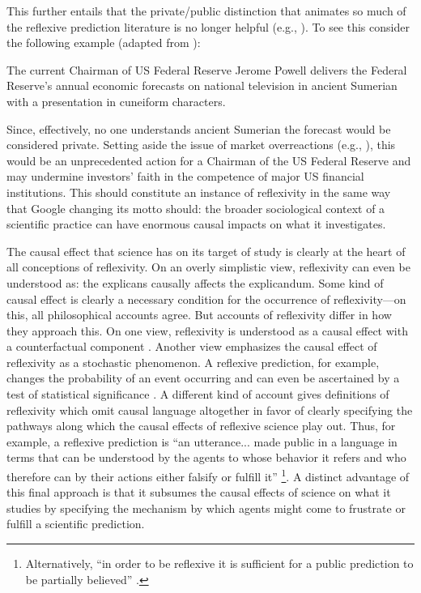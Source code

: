 This further entails that the private/public distinction that animates so much of the reflexive prediction literature is no longer helpful (e.g., \cite{buck1963,romanos1973,grunberg1986}). To see this consider the following example (adapted from \cite{grunberg1986}):

\begin{example}
The current Chairman of US Federal Reserve Jerome Powell delivers the Federal Reserve's annual economic forecasts on national television in ancient Sumerian with a presentation in cuneiform characters.
\end{example}

\noindent Since, effectively, no one understands ancient Sumerian the forecast would be considered private. Setting aside the issue of market overreactions (e.g., \cite{debondt1985}), this would be an unprecedented action for a Chairman of the US Federal Reserve and may undermine investors' faith in the competence of major US financial institutions. This should constitute an instance of reflexivity in the same way that Google changing its motto should: the broader sociological context of a scientific practice can have enormous causal impacts on what it investigates.

The causal effect that science has on its target of study is clearly at the heart of all conceptions of reflexivity. On an overly simplistic view, reflexivity can even be understood as: the explicans causally affects the explicandum. Some kind of causal effect is clearly a necessary condition for the occurrence of reflexivity---on this, all philosophical accounts agree. But accounts of reflexivity differ in how they approach this. On one view, reflexivity is understood as a causal effect with a counterfactual component \autocite{romanos1973,buck1963}. Another view emphasizes the causal effect of reflexivity as a stochastic phenomenon. A reflexive prediction, for example, changes the probability of an event occurring \autocite{kopec2011} and can even be ascertained by a test of statistical significance \autocite{cejka2022}. A different kind of account gives definitions of reflexivity which omit causal language altogether in favor of clearly specifying the pathways along which the causal effects of reflexive science play out. Thus, for example, a reflexive prediction is ``an utterance... made public in a language in terms that can be understood by the agents to whose behavior it refers and who therefore can by their actions either falsify or fulfill it'' \autocite[p476]{grunberg1986}\footnote{Alternatively, ``in order to be reflexive it is sufficient for a public prediction to be partially believed'' \autocite[p484]{grunberg1986}.}. A distinct advantage of this final approach is that it subsumes the causal effects of science on what it studies by specifying the mechanism by which agents might come to frustrate or fulfill a scientific prediction.

